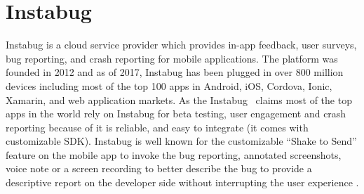 \section{Instabug}

Instabug is a cloud service provider which provides in-app feedback, user
surveys, bug reporting, and crash reporting for mobile applications. The
platform was founded in 2012 and as of 2017, Instabug has been plugged in over
800 million devices including most of the top 100 apps in Android, iOS, Cordova,
Ionic, Xamarin, and web application markets\cite{hid-sp18-409-www-instabug}. As
the Instabug~\cite{hid-sp18-409-www-instabug} claims  most of the top apps in
the world rely on Instabug for beta testing, user engagement and crash reporting
because of it is reliable, and easy to integrate (it comes with customizable
SDK). Instabug is well known for the customizable “Shake to Send” feature on the
mobile app to invoke the bug reporting, annotated screenshots, voice note or a
screen recording to better describe the bug to provide a descriptive report on
the developer side without interrupting the user experience
\cite{hid-sp18-409-www-instabug-wikipedia}.

